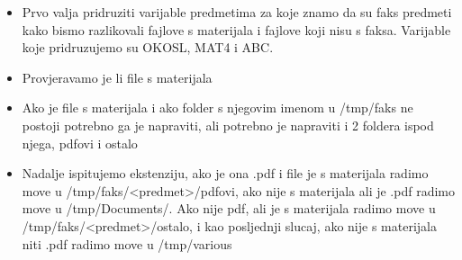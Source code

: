 \documentclass{exam}
\begin{document}
\begin{itemize}
\item Prvo valja pridruziti varijable predmetima za koje znamo da su faks predmeti kako bismo razlikovali fajlove s materijala i fajlove koji nisu s faksa. Varijable koje pridruzujemo su OKOSL, MAT4 i ABC.
\item Provjeravamo je li file s materijala
\item Ako je file s materijala i ako folder s njegovim imenom u /tmp/faks ne postoji potrebno ga je napraviti, ali potrebno je napraviti i 2 foldera ispod njega, pdfovi i ostalo
\item Nadalje ispitujemo ekstenziju, ako je ona .pdf i file je s materijala radimo move u /tmp/faks/\textless predmet\textgreater /pdfovi, ako nije s materijala ali je .pdf radimo move u /tmp/Documents/. Ako nije pdf, ali je s materijala radimo move u /tmp/faks/\textless predmet\textgreater /ostalo, i kao posljednji slucaj, ako nije s materijala niti .pdf radimo move u /tmp/various
\end{itemize}  
\end{document}
